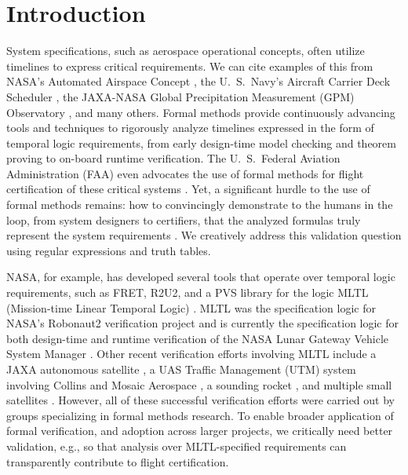 \documentclass[runningheads]{llncs}
\begin{document}
\section{Introduction}
System specifications, such as aerospace operational concepts, often utilize timelines to express critical requirements. We can cite examples of this from NASA's Automated Airspace Concept \cite{EH10}, the U.~S.~Navy's Aircraft Carrier Deck Scheduler \cite{RCRBS11}, the JAXA-NASA Global Precipitation Measurement (GPM) Observatory \cite{GPM}, and many others. Formal methods provide continuously advancing tools and techniques to rigorously analyze timelines expressed in the form of temporal logic requirements, from early design-time model checking and theorem proving to on-board runtime verification. The U.~S.~Federal Aviation Administration (FAA) even advocates the use of formal methods for flight certification of these critical systems \cite{DO-178C,DO-254,DO-333}. Yet, a significant hurdle to the use of formal methods remains: how to convincingly demonstrate to the humans in the loop, from system designers to certifiers, that the analyzed formulas truly represent the system requirements \cite{Roz16}. We creatively address this validation question using regular expressions and truth tables.

NASA, for example, has developed several tools that operate over temporal logic requirements, such as FRET\cite{GMRPSS20}, R2U2\cite{RS17}, and a PVS library \cite{CTGPD22} for the logic MLTL (Mission-time Linear Temporal Logic) \cite{RRS14,LVR22}. MLTL was the specification logic for NASA's Robonaut2 verification project \cite{KZJZR20} and is currently the specification logic for both design-time and runtime verification of the NASA Lunar Gateway Vehicle System Manager \cite{DBR21}. Other recent verification %
efforts involving MLTL include a JAXA autonomous satellite \cite{JAXA}, a UAS Traffic Management (UTM) system involving Collins and Mosaic Aerospace \cite{HCHJR21}, a sounding rocket \cite{HLR21}, and multiple small satellites \cite{LLR21,LJBHCLR22,AJR22}. However, all of these successful verification efforts were carried out by groups specializing in formal methods research. To enable broader application of formal verification, and adoption across larger projects, we critically need better validation, e.g., so that analysis over MLTL-specified requirements can transparently contribute to flight certification. 
\end{document}
